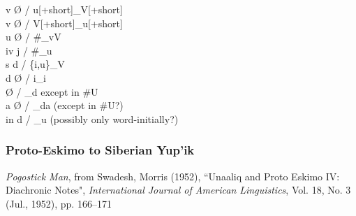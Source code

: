 \documentclass[11pt]{article}
\begin{document}
v \textrightarrow\hspace{0pt} \O\hspace{0pt} / u[+short]_V[+short] \\
v \textrightarrow\hspace{0pt} \O\hspace{0pt} / V[+short]_u[+short] \\
u \textrightarrow\hspace{0pt} \O\hspace{0pt} / \#_vV \\
iv \textrightarrow\hspace{0pt} j / \#_u \\
s \textrightarrow\hspace{0pt} d / \{i,u\}_V \\
d \textrightarrow\hspace{0pt} \O\hspace{0pt} / i_i \\
 \textrightarrow\hspace{0pt} \O\hspace{0pt} / _d except in \#U \\
a \textrightarrow\hspace{0pt} \O\hspace{0pt} / _da (except in \#U?) \\
in \textrightarrow\hspace{0pt} d / _u (possibly only word-initially?)

\subsubsection{Proto-Eskimo to Siberian Yup'ik}{\it Pogostick Man}, from Swadesh, Morris (1952), \textquotedblleft Unaaliq and Proto Eskimo IV: Diachronic Notes", \textit{International Journal of American Linguistics}, Vol. 18, No. 3 (Jul., 1952), pp. 166--171
\end{document}

